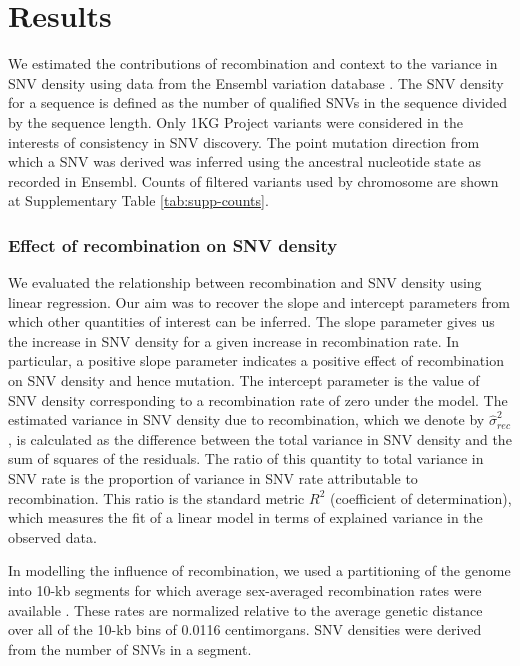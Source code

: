 \section{Results} \label{results}

We estimated the contributions of recombination and context to the variance in SNV density using data from the Ensembl variation database \citep{Cunningham2015}. The SNV density for a sequence is defined as the number of qualified SNVs in the sequence divided by the sequence length. Only 1KG Project \citep{Auton2015} variants were considered in the interests of consistency in SNV discovery. The point mutation direction from which a SNV was derived was inferred using the ancestral nucleotide state as recorded in Ensembl. Counts of filtered variants used by chromosome are shown at Supplementary Table \ref{tab:supp-counts}.

\subsubsection*{Effect of recombination on SNV density}

We evaluated the relationship between recombination and SNV density using linear regression. Our aim was to recover the slope and intercept parameters from which other quantities of interest can be inferred. The slope parameter gives us the increase in SNV density for a given increase in recombination rate. In particular, a positive slope parameter indicates a positive effect of recombination on SNV density and hence mutation. The intercept parameter is the value of SNV density corresponding to a recombination rate of zero under the model. The estimated variance in SNV density due to recombination, which we denote by $\hat{\sigma }^2_{rec}$, is calculated as the difference between the total variance in SNV density and the sum of squares of the residuals.  The ratio of this quantity to total variance in SNV rate is the proportion of variance in SNV rate attributable to recombination. This ratio is the standard metric $R^2$ (coefficient of determination), which measures the fit of a linear model in terms of explained variance in the observed data.

In modelling the influence of recombination, we used a partitioning of the genome into 10-kb segments for which average sex-averaged recombination rates were available \citep{Kong_2010}. These rates are normalized relative to the average genetic distance over all of the 10-kb bins of 0.0116 centimorgans. SNV densities were derived from the number of SNVs in a segment. 

